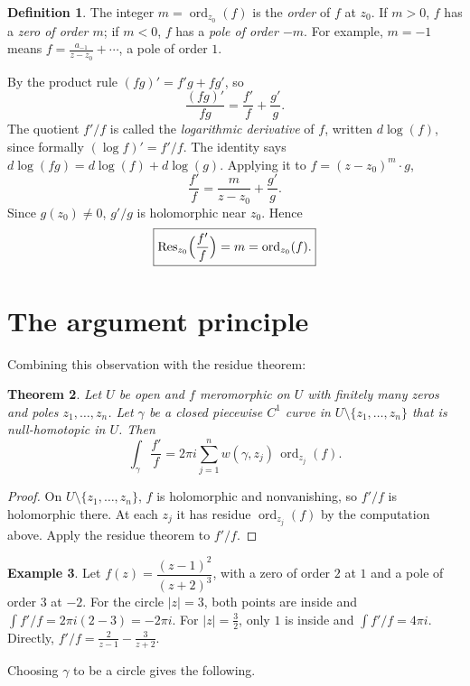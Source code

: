 \documentclass[11pt]{article}
\theoremstyle{plain}
\newtheorem{theorem}{Theorem}[section]
\theoremstyle{definition}
\newtheorem{definition}[theorem]{Definition}
\newtheorem{example}[theorem]{Example}
\theoremstyle{remark}
\numberwithin{equation}{section}
\begin{document}
\begin{definition}
The integer $m=\operatorname{ord}_{z_0}(f)$ is the \emph{order} of $f$
at $z_0$. If $m>0$, $f$ has a \emph{zero of order $m$}; if $m<0$, $f$ has a
\emph{pole of order $-m$}. For example, $m=-1$ means
$f=\frac{a_{-1}}{z-z_0}+\cdots$, a pole of order $1$.
\end{definition}

By the product rule $(fg)'=f'g+fg'$, so
\[
 \frac{(fg)'}{fg}=\frac{f'}{f}+\frac{g'}{g}.
\]
The quotient $f'/f$ is called the \emph{logarithmic derivative} of $f$,
written $d\log(f)$, since formally $(\log f)'=f'/f$. The identity says
$d\log(fg)=d\log(f)+d\log(g)$. Applying it to $f=(z-z_0)^m\cdot g$,
\[
 \frac{f'}{f}=\frac{m}{z-z_0}+\frac{g'}{g}.
\]
Since $g(z_0)\ne0$, $g'/g$ is holomorphic near $z_0$. Hence
\[
 \boxed{\operatorname{Res}_{z_0}\Bigl(\frac{f'}{f}\Bigr)
 =m=\operatorname{ord}_{z_0}(f).}
\]

\section{The argument principle}
Combining this observation with the residue theorem:

\begin{theorem}\label{thm:log-derivative}
Let $U$ be open and $f$ meromorphic on $U$ with finitely many zeros and
poles $z_1,\dots,z_n$. Let $\gamma$ be a closed piecewise $C^1$ curve in
$U\setminus\{z_1,\dots,z_n\}$ that is null-homotopic in $U$. Then
\[
 \int_\gamma\frac{f'}{f}=2\pi i\sum_{j=1}^{n}w(\gamma,z_j)\,
 \operatorname{ord}_{z_j}(f).
\]
\end{theorem}
\begin{proof}
On $U\setminus\{z_1,\dots,z_n\}$, $f$ is holomorphic and nonvanishing, so
$f'/f$ is holomorphic there. At each $z_j$ it has residue
$\operatorname{ord}_{z_j}(f)$ by the computation above. Apply the residue
theorem to $f'/f$.
\end{proof}

\begin{example}
Let $f(z)=\dfrac{(z-1)^2}{(z+2)^3}$, with a zero of order $2$ at $1$ and a
pole of order $3$ at $-2$. For the circle $|z|=3$, both points are inside
and $\int f'/f=2\pi i(2-3)=-2\pi i$. For $|z|=\tfrac32$, only $1$ is inside
and $\int f'/f=4\pi i$. Directly,
$f'/f=\frac{2}{z-1}-\frac{3}{z+2}$.
\end{example}

\newpage
Choosing $\gamma$ to be a circle gives the following.
\end{document}
